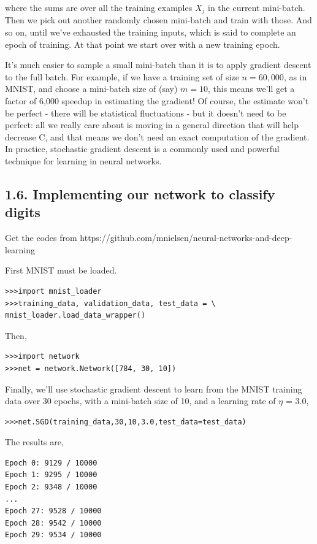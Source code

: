 \documentclass[12 pt]{article}
\begin{document}
where the sums are over all the training examples $ X_j $ in the
current mini-batch. Then we pick out another randomly chosen mini-batch
and train with those. And so on, until we've exhausted the training
inputs, which is said to complete an epoch of training. At that point we
start over with a new training epoch.

It's much easier to sample a small mini-batch than it is to apply
gradient descent to the full batch. For example, if we have a training
set of size $ n = 60,000 $, as in MNIST, and choose a mini-batch size of
(say) $ m = 10 $, this means we'll get a factor of 6,000 speedup in
estimating the gradient! Of course, the estimate won't be perfect -
there will be statistical fluctuations - but it doesn't need to be perfect:
all we really care about is moving in a general direction that will help
decrease C, and that means we don't need an exact computation of the gradient.
In practice, stochastic gradient descent is a commonly used and powerful
technique for learning in neural networks.

\subsection{1.6. Implementing our network to classify digits}
\label{implementing-our-network-to-classify-digits}

Get the codes from
https://github.com/mnielsen/neural-networks-and-deep-learning\cite{ref2}

First MNIST must be loaded.

\begin{verbatim}
>>>import mnist_loader
>>>training_data, validation_data, test_data = \
mnist_loader.load_data_wrapper()
\end{verbatim}

Then,

\begin{verbatim}
>>>import network
>>>net = network.Network([784, 30, 10])
\end{verbatim}

Finally, we'll use stochastic gradient descent to learn from the MNIST
training data over 30 epochs, with a mini-batch size of 10, and a
learning rate of $ \eta $ = 3.0,

\begin{verbatim}
>>>net.SGD(training_data,30,10,3.0,test_data=test_data)
\end{verbatim}

The results are,

\begin{verbatim}
Epoch 0: 9129 / 10000
Epoch 1: 9295 / 10000
Epoch 2: 9348 / 10000
...
Epoch 27: 9528 / 10000
Epoch 28: 9542 / 10000
Epoch 29: 9534 / 10000
\end{verbatim}
\end{document}
